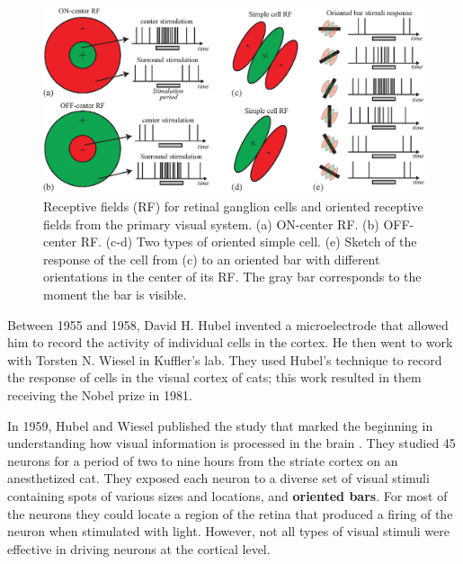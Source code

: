 \begin{figure}[t]
    \centerline{
        \includegraphics[width=1\linewidth]{figures/taxonomy/receptive_fields.eps}
    }
    \caption{Receptive fields (RF) for retinal ganglion cells and oriented receptive fields from the primary visual system. (a) ON-center RF. (b) OFF-center RF. (c-d) Two types of oriented simple cell. (e) Sketch of the response of the cell from (c) to an oriented bar with different orientations in the center of its RF. The gray bar corresponds to the moment the bar is visible.}
    \label{fig:receptivefields}
\end{figure}

Between 1955 and 1958, David H. Hubel invented a microelectrode that allowed him to record the activity of individual cells in the cortex. He then went to work with Torsten N. Wiesel in Kuffler's lab. They used Hubel's technique to record the response of cells in the visual cortex of cats; this work resulted in them receiving the Nobel prize in 1981.



In 1959, Hubel and Wiesel published the study that marked the beginning in understanding how visual information is processed in the brain \cite{HubelWiesel59}. They studied 45 neurons for a period of two to nine hours from the striate cortex on an anesthetized cat. They exposed each neuron to a diverse set of visual stimuli containing spots of various sizes and locations, and {\bf oriented bars}. For most of the neurons they could locate a region of the retina that produced a firing of the neuron when stimulated with light. However, not all types of visual stimuli were effective in driving neurons at the cortical level. %

